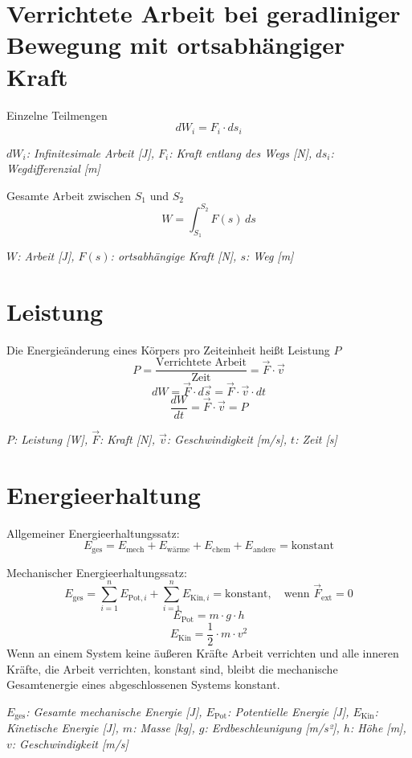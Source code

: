 \documentclass[a4paper,10pt]{article}
\newenvironment{displayformula}
{
	\begin{framed}
		\color{formulaColor}
	}
	{\end{framed}}
\newcommand{\formulalegend}[1]{%
	\par\vspace{0.5ex}%
	{{\color{legendColor}\RaggedRight\small\textit{#1}}}%
	\par\vspace{1.5ex}%
}
\begin{document}
\section{Verrichtete Arbeit bei geradliniger Bewegung mit ortsabhängiger Kraft}

\begin{displayformula}
	Einzelne Teilmengen
	\[
	dW_i = F_i \cdot ds_i
	\]
\end{displayformula}
\formulalegend{
	\( dW_i \): Infinitesimale Arbeit [J], \( F_i \): Kraft entlang des Wegs [N], \( ds_i \): Wegdifferenzial [m]
}

\begin{displayformula}
	Gesamte Arbeit zwischen \( S_1 \) und \( S_2 \)
	\[
	W = \int_{S_1}^{S_2} F(s) \, ds
	\]
\end{displayformula}
\formulalegend{
	\( W \): Arbeit [J], \( F(s) \): ortsabhängige Kraft [N], \( s \): Weg [m]
}


\section{Leistung}

\begin{displayformula}
	Die Energieänderung eines Körpers pro Zeiteinheit heißt Leistung \( P \)
	\[
	P = \frac{\text{Verrichtete Arbeit}}{\text{Zeit}} = \vec{F} \cdot \vec{v}
	\]
	\[
	dW = \vec{F} \cdot d \vec{s} = \vec{F} \cdot \vec{v} \cdot dt
	\]
	\[
	\frac{dW}{dt} = \vec{F} \cdot \vec{v} = P
	\]
\end{displayformula}
\formulalegend{
	\( P \): Leistung [W], \( \vec{F} \): Kraft [N], \( \vec{v} \): Geschwindigkeit [m/s], \( t \): Zeit [s]
}

\section{Energieerhaltung}

\begin{displayformula}
	Allgemeiner Energieerhaltungssatz: 
	\[
	E_{\text{ges}} = E_{\text{mech}} + E_{\text{wärme}} + E_{\text{chem}} + E_{\text{andere}} = \text{konstant}
	\]
\end{displayformula}

\begin{displayformula}
	Mechanischer Energieerhaltungssatz:
	\[
	E_{\text{ges}} = \sum_{i=1}^{n} E_{\text{Pot}, i} + \sum_{i=1}^{n} E_{\text{Kin}, i} = \text{konstant}, \quad \text{wenn } \vec{F}_{\text{ext}} = 0
	\]
	\[
	E_{\text{Pot}} = m \cdot g \cdot h
	\]
	\[
	E_{\text{Kin}} = \frac{1}{2} \cdot m \cdot v^2
	\]
	Wenn an einem System keine äußeren Kräfte Arbeit verrichten und alle inneren Kräfte, die Arbeit verrichten, konstant sind, bleibt die mechanische Gesamtenergie eines abgeschlossenen Systems konstant.
\end{displayformula}
\formulalegend{
	\( E_{\text{ges}} \): Gesamte mechanische Energie [J], \( E_{\text{Pot}} \): Potentielle Energie [J], \( E_{\text{Kin}} \): Kinetische Energie [J], \( m \): Masse [kg], \( g \): Erdbeschleunigung [m/s²], \( h \): Höhe [m], \( v \): Geschwindigkeit [m/s]
}
\end{document}
